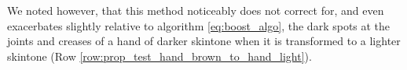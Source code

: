 We noted however, that this method noticeably does not correct for, and even exacerbates slightly relative to algorithm \ref{eq:boost_algo}, the dark spots at the joints and creases of a hand of darker skintone when it is transformed to a lighter skintone (Row \ref{row:prop_test_hand_brown_to_hand_light}).
